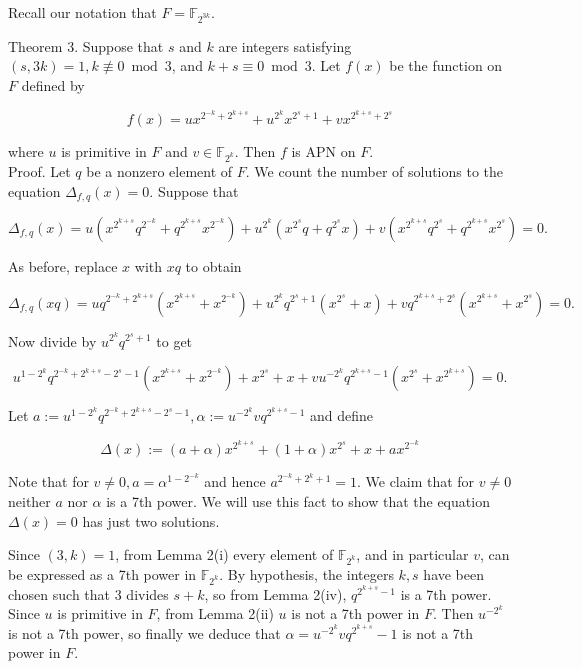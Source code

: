\documentclass[10pt]{article}
\begin{document}
Recall our notation that $F=\mathbb{F}_{2^{3 k}}$.

Theorem 3. Suppose that $s$ and $k$ are integers satisfying $(s, 3 k)=1, k \not \equiv 0 \bmod 3$, and $k+s \equiv 0 \bmod 3$. Let $f(x)$ be the function on $F$ defined by

$$
f(x)=u x^{2^{-k}+2^{k+s}}+u^{2^{k}} x^{2^{s}+1}+v x^{2^{k+s}+2^{s}}
$$

where $u$ is primitive in $F$ and $v \in \mathbb{F}_{2^{k}}$. Then $f$ is APN on $F$.\\
Proof. Let $q$ be a nonzero element of $F$. We count the number of solutions to the equation $\Delta_{f, q}(x)=0$. Suppose that

$$
\Delta_{f, q}(x)=u\left(x^{2^{k+s}} q^{2^{-k}}+q^{2^{k+s}} x^{2^{-k}}\right)+u^{2^{k}}\left(x^{2^{s}} q+q^{2^{s}} x\right)+v\left(x^{2^{k+s}} q^{2^{s}}+q^{2^{k+s}} x^{2^{s}}\right)=0 .
$$

As before, replace $x$ with $x q$ to obtain

$$
\Delta_{f, q}(x q)=u q^{2^{-k}+2^{k+s}}\left(x^{2^{k+s}}+x^{2^{-k}}\right)+u^{2^{k}} q^{2^{s}+1}\left(x^{2^{s}}+x\right)+v q^{2^{k+s}+2^{s}}\left(x^{2^{k+s}}+x^{2^{s}}\right)=0 .
$$

Now divide by $u^{2^{k}} q^{2^{s}+1}$ to get

$$
u^{1-2^{k}} q^{2^{-k}+2^{k+s}-2^{s}-1}\left(x^{2^{k+s}}+x^{2^{-k}}\right)+x^{2^{s}}+x+v u^{-2^{k}} q^{2^{k+s}-1}\left(x^{2^{s}}+x^{2^{k+s}}\right)=0 .
$$

Let $a:=u^{1-2^{k}} q^{2^{-k}+2^{k+s}-2^{s}-1}, \alpha:=u^{-2^{k}} v q^{2^{k+s}-1}$ and define


\begin{equation*}
\Delta(x):=(a+\alpha) x^{2^{k+s}}+(1+\alpha) x^{2^{s}}+x+a x^{2^{-k}} \tag{5}
\end{equation*}


Note that for $v \neq 0, a=\alpha^{1-2^{-k}}$ and hence $a^{2^{-k}+2^{k}+1}=1$. We claim that for $v \neq 0$ neither $a$ nor $\alpha$ is a 7th power. We will use this fact to show that the equation $\Delta(x)=0$ has just two solutions.

Since $(3, k)=1$, from Lemma 2(i) every element of $\mathbb{F}_{2^{k}}$, and in particular $v$, can be expressed as a 7th power in $\mathbb{F}_{2^{k}}$. By hypothesis, the integers $k, s$ have been chosen such that 3 divides $s+k$, so from Lemma 2(iv), $q^{2^{k+s}-1}$ is a 7th power. Since $u$ is primitive in $F$, from Lemma 2(ii) $u$ is not a 7th power in $F$. Then $u^{-2^{k}}$ is not a 7th power, so finally we deduce that $\alpha=u^{-2^{k}} v q^{2^{k+s}}-1$ is not a 7th power in $F$.
\end{document}
